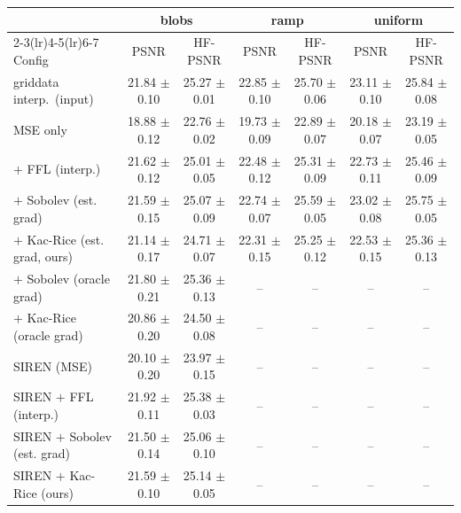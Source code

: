 \begin{tabular}{lcccccc}
\toprule
 & \multicolumn{2}{c}{blobs} & \multicolumn{2}{c}{ramp} & \multicolumn{2}{c}{uniform} \\
\cmidrule(lr){2-3}\cmidrule(lr){4-5}\cmidrule(lr){6-7}
Config & PSNR & HF-PSNR & PSNR & HF-PSNR & PSNR & HF-PSNR \\
\midrule
griddata interp.\ (input) & 21.84 $\pm$ 0.10 & 25.27 $\pm$ 0.01 & 22.85 $\pm$ 0.10 & 25.70 $\pm$ 0.06 & 23.11 $\pm$ 0.10 & 25.84 $\pm$ 0.08 \\
\midrule
MSE only & 18.88 $\pm$ 0.12 & 22.76 $\pm$ 0.02 & 19.73 $\pm$ 0.09 & 22.89 $\pm$ 0.07 & 20.18 $\pm$ 0.07 & 23.19 $\pm$ 0.05 \\
$+$ FFL (interp.) & 21.62 $\pm$ 0.12 & 25.01 $\pm$ 0.05 & 22.48 $\pm$ 0.12 & 25.31 $\pm$ 0.09 & 22.73 $\pm$ 0.11 & 25.46 $\pm$ 0.09 \\
$+$ Sobolev (est. grad) & 21.59 $\pm$ 0.15 & 25.07 $\pm$ 0.09 & 22.74 $\pm$ 0.07 & 25.59 $\pm$ 0.05 & 23.02 $\pm$ 0.08 & 25.75 $\pm$ 0.05 \\
$+$ Kac-Rice (est. grad, ours) & 21.14 $\pm$ 0.17 & 24.71 $\pm$ 0.07 & 22.31 $\pm$ 0.15 & 25.25 $\pm$ 0.12 & 22.53 $\pm$ 0.15 & 25.36 $\pm$ 0.13 \\
$+$ Sobolev (oracle grad) & 21.80 $\pm$ 0.21 & 25.36 $\pm$ 0.13 & -- & -- & -- & -- \\
$+$ Kac-Rice (oracle grad) & 20.86 $\pm$ 0.20 & 24.50 $\pm$ 0.08 & -- & -- & -- & -- \\
SIREN (MSE) & 20.10 $\pm$ 0.20 & 23.97 $\pm$ 0.15 & -- & -- & -- & -- \\
SIREN $+$ FFL (interp.) & 21.92 $\pm$ 0.11 & 25.38 $\pm$ 0.03 & -- & -- & -- & -- \\
SIREN $+$ Sobolev (est. grad) & 21.50 $\pm$ 0.14 & 25.06 $\pm$ 0.10 & -- & -- & -- & -- \\
SIREN $+$ Kac-Rice (ours) & 21.59 $\pm$ 0.10 & 25.14 $\pm$ 0.05 & -- & -- & -- & -- \\
\bottomrule
\end{tabular}